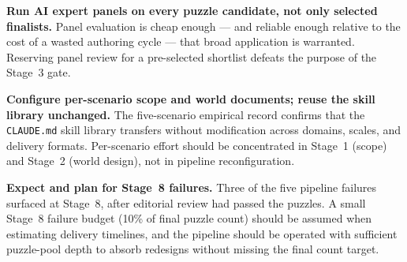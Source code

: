 \textbf{Run AI expert panels on every puzzle candidate, not only selected finalists.} Panel evaluation is cheap enough — and reliable enough relative to the cost of a wasted authoring cycle — that broad application is warranted. Reserving panel review for a pre-selected shortlist defeats the purpose of the Stage~3 gate.

\textbf{Configure per-scenario scope and world documents; reuse the skill library unchanged.} The five-scenario empirical record confirms that the \texttt{CLAUDE.md} skill library transfers without modification across domains, scales, and delivery formats. Per-scenario effort should be concentrated in Stage~1 (scope) and Stage~2 (world design), not in pipeline reconfiguration.

\textbf{Expect and plan for Stage~8 failures.} Three of the five pipeline failures surfaced at Stage~8, after editorial review had passed the puzzles. A small Stage~8 failure budget (10\% of final puzzle count) should be assumed when estimating delivery timelines, and the pipeline should be operated with sufficient puzzle-pool depth to absorb redesigns without missing the final count target.
